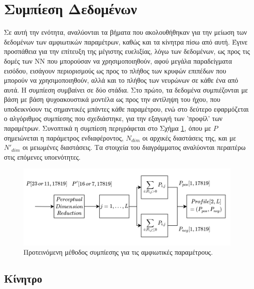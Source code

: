 \section{Συμπίεση Δεδομένων} \label{sec:data_compression}
\noindent
Σε αυτή την ενότητα, αναλύονται τα βήματα που ακολουθήθηκαν για την μείωση των δεδομένων των αμφιωτικών παραμέτρων, καθώς και τα κίνητρα πίσω από αυτή. Έγινε προσπάθεια για την επίτευξη της μέγιστης ευελιξίας, λόγω των δεδομένων, ως προς τις δομές των ΝΝ που μπορούσαν να χρησιμοποιηθούν, αφού μεγάλα παραδείγματα εισόδου, εισάγουν περιορισμούς ως προς το πλήθος των κρυφών επιπέδων που μπορούν να χρησιμοποιηθούν, αλλά και το πλήθος των νευρώνων σε κάθε ένα από αυτά. Η συμπίεση συμβαίνει σε δύο στάδια. Στο πρώτο, τα δεδομένα συμπιέζονται με βάση με βάση ψυχοακουστικά μοντέλα ως προς την αντίληψη του ήχου, που υποδεικνύουν τις σημαντικές μπάντες κάθε παραμέτρου, ενώ στο δεύτερο εφαρμόζεται ο αλγόριθμος συμπίεσης που σχεδιάστηκε, για την εξαγωγή των 'προφίλ' των παραμέτρων. Συνοπτικά η συμπίεση περιγράφεται στο Σχήμα \ref{fig:Compression_block_diagram}, όπου με $P$ σημειώνεται η παράμετρος ενδιαφέροντος, $N_{dim}$ οι αρχικές διαστάσεις της, και με $N'_{dim}$ οι μειωμένες διαστάσεις. Τα στοιχεία του διαγράμματος αναλύονται περαιτέρω στις επόμενες υποενότητες.

\begin{figure}[h]
  \centering
  \includegraphics[width=\textwidth]{images/Compression_block_diagram.png}
  \caption{Προτεινόμενη μέθοδος συμπίεσης για τις αμφιωτικές παραμέτρους.}
  \label{fig:Compression_block_diagram}
\end{figure}

\subsection{Κίνητρο}

